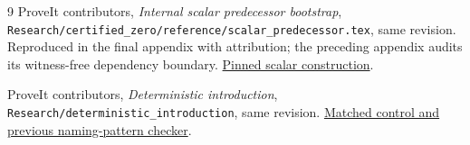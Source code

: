 \documentclass[11pt]{article}
\theoremstyle{definition}
\theoremstyle{remark}
\begin{document}
\begin{thebibliography}{9}
ProveIt contributors, \emph{Internal scalar predecessor bootstrap},
\texttt{Research/certified\_zero/reference/scalar\_predecessor.tex},
same revision. Reproduced in the final appendix with attribution;
the preceding appendix audits its witness-free dependency boundary.
\href{https://github.com/VladimirReshetnikov/ProveIt/blob/8fa5ade009b5cceba7b68f07b6a834fe77cf10c1/Logic/PrimitiveRecursiveArithmetic/ConciseIPRA/Research/certified_zero/reference/scalar_predecessor.tex}{Pinned scalar construction}.

ProveIt contributors, \emph{Deterministic introduction},
\texttt{Research/deterministic\_introduction}, same revision.
\href{https://github.com/VladimirReshetnikov/ProveIt/tree/8fa5ade009b5cceba7b68f07b6a834fe77cf10c1/Logic/PrimitiveRecursiveArithmetic/ConciseIPRA/Research/deterministic_introduction}{Matched control and previous naming-pattern checker}.
\end{thebibliography}
\end{document}
